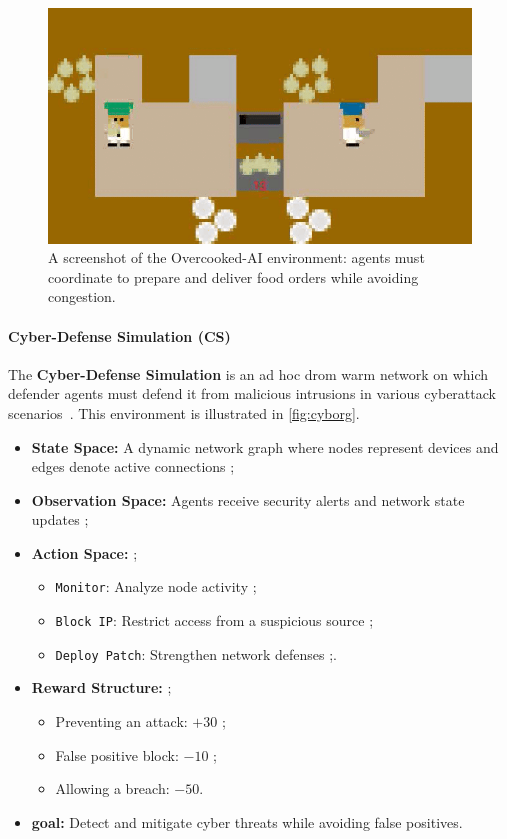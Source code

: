 \documentclass[pdflatex,sn-mathphys-num]{sn-jnl}%
\theoremstyle{thmstyleone}%
\theoremstyle{thmstyletwo}%
\theoremstyle{thmstylethree}%
\begin{document}
\begin{figure}[h!]
    \centering
    \includegraphics[width=0.7\linewidth]{figures/overcooked.png}
    \caption{A screenshot of the Overcooked-AI environment: agents must coordinate to prepare and deliver food orders while avoiding congestion.}
    \label{fig:overcooked}
\end{figure}

\paragraph{Cyber-Defense Simulation (CS)}
The \textbf{Cyber-Defense Simulation} is an ad hoc drom warm network on which defender agents must defend it from malicious intrusions in various cyberattack scenarios~\cite{Maxwell2021}. This environment is illustrated in \autoref{fig:cyborg}.

\begin{itemize}
    \item \textbf{State Space:} A dynamic network graph where nodes represent devices and edges denote active connections ;
    \item \textbf{Observation Space:} Agents receive security alerts and network state updates ;
    \item \textbf{Action Space:}  ;
          \begin{itemize}
              \item \texttt{Monitor}: Analyze node activity ;
              \item \texttt{Block IP}: Restrict access from a suspicious source ;
              \item \texttt{Deploy Patch}: Strengthen network defenses ;.
          \end{itemize}
    \item \textbf{Reward Structure:} ;
          \begin{itemize}
              \item Preventing an attack: $+30$ ;
              \item False positive block: $-10$ ;
              \item Allowing a breach: $-50$.
          \end{itemize}
    \item \textbf{goal:} Detect and mitigate cyber threats while avoiding false positives.
\end{itemize}
\end{document}
